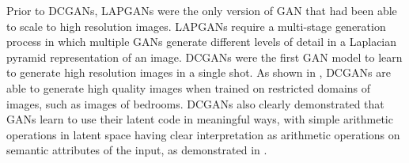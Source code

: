 Prior to DCGANs, LAPGANs \citep{denton2015deep} were the only version of GAN
that had been able to scale to high resolution images.
LAPGANs require a multi-stage generation process in which multiple GANs
generate different levels of detail in a Laplacian pyramid representation
of an image.
DCGANs were the first GAN model to learn to generate high resolution images
in a single shot.
As shown in , DCGANs are able to generate high quality
images when trained on restricted domains of images, such as images of bedrooms.
DCGANs also clearly demonstrated that GANs learn to use their latent code
in meaningful ways, with simple arithmetic operations in latent space
having clear interpretation as arithmetic operations on semantic attributes
of the input, as demonstrated in .



